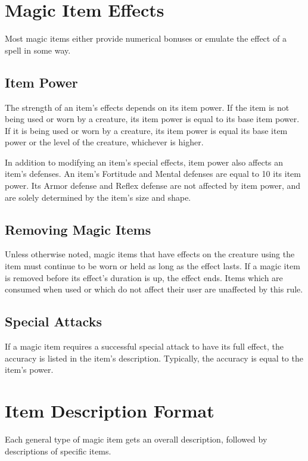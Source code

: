 \section{Magic Item Effects}
    Most magic items either provide numerical bonuses or emulate the effect of a spell in some way.

    \subsection{Item Power}\label{Item Power}
        The strength of an item's effects depends on its item power.
        If the item is not being used or worn by a creature, its item power is equal to its base item power.
        If it is being used or worn by a creature, its item power is equal its base item power or the level of the creature, whichever is higher.

        In addition to modifying an item's special effects, item power also affects an item's defenses.
        An item's Fortitude and Mental defenses are equal to 10 \add its item power.
        Its Armor defense and Reflex defense are not affected by item power, and are solely determined by the item's size and shape.

    \subsection{Removing Magic Items}
        Unless otherwise noted, magic items that have effects on the creature using the item must continue to be worn or held as long as the effect lasts.
        If a magic item is removed before its effect's duration is up, the effect ends.
        Items which are consumed when used or which do not affect their user are unaffected by this rule.

    \subsection{Special Attacks}
        If a magic item requires a successful special attack to have its full effect, the accuracy is listed in the item's description.
        Typically, the accuracy is equal to the item's power.

\section{Item Description Format}

    Each general type of magic item gets an overall description, followed by descriptions of specific items.

